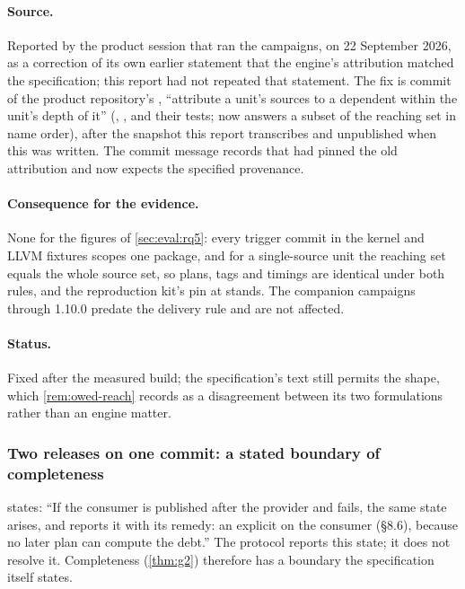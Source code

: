 \paragraph{Source.} Reported by the product session that ran the campaigns,
on 22 September 2026, as a correction of its own earlier statement that the
engine's attribution matched the specification; this report had not repeated
that statement. The fix is commit  of the product repository's
, ``attribute a unit's sources to a dependent within the unit's
depth of it'' (, ,
 and their tests;  now answers a subset
of the reaching set in name order), after the snapshot  this
report transcribes and unpublished when this was written. The commit message
records that 
had pinned the old attribution and now expects the specified provenance.

\paragraph{Consequence for the evidence.} None for the figures of
\cref{sec:eval:rq5}: every trigger commit in the kernel and LLVM fixtures
scopes one package, and for a single-source unit the reaching set equals the
whole source set, so plans, tags and timings are identical under both rules,
and the reproduction kit's pin at  stands. The companion
campaigns through 1.10.0 predate the delivery rule and are not affected.

\paragraph{Status.} Fixed after the measured build; the specification's text
still permits the shape, which \cref{rem:owed-reach} records as a
disagreement between its two formulations rather than an engine matter.

\subsubsection{Two releases on one commit: a stated boundary of completeness}

\begin{obligation}
\label{ob:samecommit}
 states: ``If the consumer is published after the provider and
fails, the same state arises, and  reports it with its remedy: an
explicit  on the consumer (\S8.6), because no
later plan can compute the debt.'' The protocol reports this state; it does
not resolve it. Completeness (\cref{thm:g2}) therefore has a boundary the
specification itself states.
\end{obligation}

